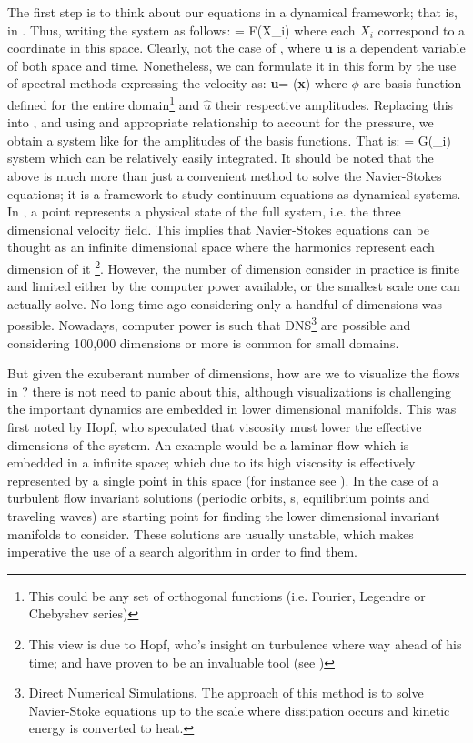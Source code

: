 The first step is to think about our equations in a dynamical framework;
that is, in \statesp. Thus, writing the system as follows:
\beq
{} = F(X_i)
where each $X_i$ correspond to a coordinate in this space. Clearly, not
the case of , where $\textbf{u}$ is a dependent variable of
both space and time. Nonetheless, we can formulate it in this form by the
use of spectral methods expressing the velocity as:
\beq
\textbf{u}=\sum {} \phi (\textbf{x})
where $\phi$ are basis function defined for the entire
domain\footnote{This could be any set of orthogonal functions (i.e.
Fourier, Legendre or Chebyshev series)} and $\widehat{u}$ their
respective amplitudes. Replacing this into , and using and
appropriate relationship to account for the pressure, we obtain a system
like  for the amplitudes of the basis functions. That is:
\beq
{} = G(_i)
system which can be relatively easily integrated.
It should be noted that the above is much more than just a convenient
method to solve the Navier-Stokes equations; it is a framework to study
continuum equations as dynamical systems. In \statesp, a point
represents a physical state of the full system, i.e. the three
dimensional velocity field. This implies that Navier-Stokes equations can
be thought as an infinite dimensional space where the harmonics represent
each dimension of it \footnote{This view is due to Hopf, who's insight on
turbulence where way ahead of his time; and have proven to be an
invaluable tool (see )}. However, the number of dimension
consider in practice is finite and limited either by the computer power
available, or the smallest scale one can actually solve. No long time ago
considering only a handful of dimensions was possible.
Nowadays, computer power is such that DNS\footnote{Direct Numerical
Simulations. The approach of this method is to solve Navier-Stoke
equations up to the scale where dissipation occurs and kinetic energy is
converted to heat.} are possible and considering 100,000 dimensions or
more is common for small domains.

But given the exuberant number of dimensions, how are we to visualize the
flows in \statesp? there is not need to panic about this, although
visualizations is challenging the important dynamics are embedded in
lower dimensional manifolds. This was first noted by Hopf, who speculated
that viscosity must lower the effective dimensions of the system. An
example would be a laminar flow which is embedded in a infinite space;
which due to its high viscosity is effectively represented by a single
point in this space (for instance see ). In the case of a
turbulent flow invariant solutions (periodic orbits, \rpo s, equilibrium
points and traveling waves) are starting point for finding the lower
dimensional invariant manifolds to consider. These solutions are usually
unstable, which makes imperative the use of a search algorithm in order
to find them.

